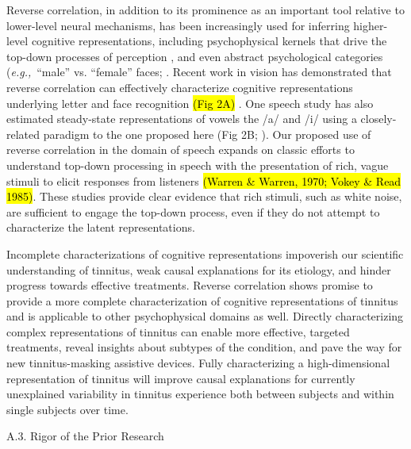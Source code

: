 \documentclass[11pt, notitlepage]{article} %
\def\eg{{\emph{e.g.,}}~}
\begin{document}
Reverse correlation, in addition to its prominence as an important tool relative to lower-level
neural mechanisms, has been increasingly used for inferring higher-level cognitive representations,
including psychophysical kernels that drive the top-down processes of perception
\cite{ahumadaStimulusFeaturesSignal1971, neriReceptivePerceptiveFields2006,gosselinSuperstitiousPerceptionsReveal2003,smithMeasuringInternalRepresentations2012}, 
and even abstract psychological
categories (\eg ``male'' vs. ``female'' faces; \cite{brinkmanVisualisingMentalRepresentations2017,manginiMakingIneffableExplicit2004,ponsotCrackingSocialCode2018}.
Recent work in vision has demonstrated that
reverse correlation can effectively characterize cognitive representations underlying letter and face
recognition \hl{(Fig 2A)} \cite{gosselinSuperstitiousPerceptionsReveal2003,liuSeeingJesusToast2014}.
One speech study has also estimated steady-state representations of vowels the /a/
and /i/ using a closely-related paradigm to the one proposed here (Fig 2B; \cite{brimijoinInternalRepresentationVowel2013}). Our
proposed use of reverse correlation in the domain of speech expands on classic efforts to understand
top-down processing in speech with the presentation of rich, vague stimuli to elicit responses from
listeners \hl{(Warren \& Warren, 1970; Vokey \& Read 1985)}. These studies provide clear evidence that rich
stimuli, such as white noise, are sufficient to engage the top-down process, even if they do not attempt to
characterize the latent representations.

Incomplete characterizations of cognitive representations impoverish our scientific understanding of tinnitus,
weak causal explanations for its etiology, and hinder progress towards effective treatments.
Reverse correlation shows promise to provide a more complete characterization of cognitive representations of tinnitus
and is applicable to other psychophysical domains as well.
Directly characterizing complex representations of tinnitus can enable more effective, targeted treatments,
reveal insights about subtypes of the condition, and pave the way for new tinnitus-masking assistive devices.
Fully characterizing a high-dimensional representation of tinnitus will improve causal explanations
for currently unexplained variability in tinnitus experience both between subjects and within single subjects over time.

\begin{description}
	\item[A.3. Rigor of the Prior Research]{}
\end{description}
\end{document}

